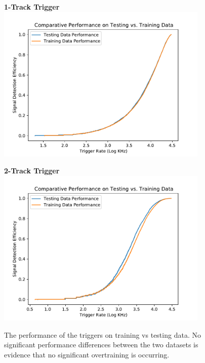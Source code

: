 \documentclass[12pt, letterpaper]{article}
\begin{document}
\begin{figure}
\centering
\textbf{1-Track Trigger}\\
\includegraphics[width=0.9\textwidth]{1trackOvertrainRoc.pdf}

\textbf{2-Track Trigger}\\
\includegraphics[width=0.9\textwidth]{2trackOvertrainRoc.pdf}
\caption{The performance of the triggers on training vs testing data. No significant performance differences between the two datasets is evidence that no significant overtraining is occurring.}
\label{fig:overtrainRoc}
\end{figure}
\end{document}
